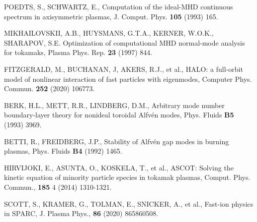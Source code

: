 \documentclass[10pt, a4paper, twoside]{article}
\begin{document}
\begin{thebibliography}{9}
    POEDTS, S., SCHWARTZ, E.,
    Computation of the ideal-MHD continuous spectrum in axisymmetric plasmas,
    J. Comput. Phys.
    \textbf{105}
    (1993)
    165.

    MIKHAILOVSKII, A.B., HUYSMANS, G.T.A., KERNER, W.O.K., SHARAPOV, S.E.
    Optimization of computational MHD normal-mode analysis for tokamaks,
    Plasma Phys. Rep.
    \textbf{23}
    (1997)
    844.

    FITZGERALD, M., BUCHANAN, J, AKERS, R.J., et al.,
    HALO: a full-orbit model of nonlinear interaction of fast particles with eigenmodes,
    Computer Phys. Commun.
    \textbf{252}
    (2020)
    106773.

    BERK, H.L., METT, R.R., LINDBERG, D.M.,
    Arbitrary mode number boundary-layer theory for nonideal toroidal Alfv\'en modes,
    Phys. Fluids
    \textbf{B5}
    (1993)
    3969.

    BETTI, R., FREIDBERG, J.P.,
    Stability of Alfv\'en gap modes in burning plasmas,
    Phys. Fluids
    \textbf{B4}
    (1992)
    1465.

    HIRVIJOKI, E., ASUNTA, O., KOSKELA, T., et al.,
    ASCOT: Solving the kinetic equation of minority particle species in tokamak plasmas,
    Comput. Phys. Commun.,
    \textbf{185} 4 
    (2014) 
    1310-1321.

    SCOTT, S., KRAMER, G., TOLMAN, E., SNICKER, A., et al.,
    Fast-ion physics in SPARC,
    J. Plasma Phys.,
    \textbf{86}
    (2020) 
    865860508.
    

\end{thebibliography}
\end{document}
